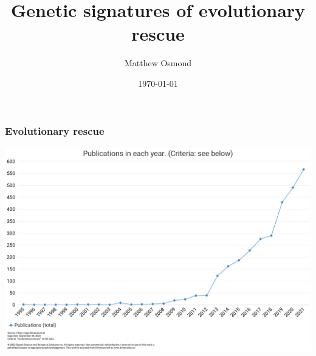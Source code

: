 \documentclass{beamer}
\title{Genetic signatures of evolutionary rescue}
\author{Matthew Osmond}
\institute{Department of Ecology and Evolutionary Biology\\ University of Toronto}
\date{\today}
\begin{document}

\begin{frame}
	\titlepage
\end{frame}




\begin{frame}
	\frametitle{Evolutionary rescue}

	\begin{center}
		\includegraphics[width=\linewidth]{../images/er-trend.png}
	\end{center}

\end{frame}

\end{document}
